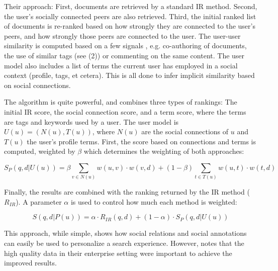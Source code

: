 Their approach: First, documents are retrieved by a standard IR method. Second, the user's socially connected peers
are also retrieved. Third, the initial ranked list of documents is re-ranked based on how strongly they are connected 
to the user's peers, and how strongly those peers are connected to the user. The user-user similarity is
computed based on a few signals \cite[p2]{Carmel2009}, e.g. co-authoring of documents, the use of similar tags
(see (2)) or commenting on the same content. 
The user model also includes a list of terms the current user has employed in a social context (profile, tags, et cetera).
This is all done to infer implicit similarity based on social connections.

The algorithm is quite powerful, and combines three types of rankings: 
The initial IR score, the social connection score, and a term score, where the terms are tags and keywords used by a user.
The user model is $U(u) = (N(u), T(u))$, 
where $N(u)$ are the social connections of $u$ and $T(u)$ the user's profile terms.
First, the score based on connections and terms is computed, weighted by $\beta$ which determines the weighting of both approaches:

\begin{equation*}
  S_P(q,d|U(u)) = \beta \sum_{v \in N(u)} w(u,v) \cdot w(v,d) + (1-\beta) \sum_{t \in T(u)} w(u,t) \cdot w(t,d)
\end{equation*}

Finally, the results are combined with the ranking returned by the IR method ($R_{IR}$). 
A parameter $\alpha$ is used to control how much each method is weighted:

\begin{equation*}
  S(q,d|P(u)) = \alpha \cdot R_{IR}(q,d) + (1-\alpha) \cdot S_P(q,d|U(u)) 
\end{equation*}

This approach, while simple, shows how social relations and social annotations can easily be used to personalize a search experience.
However, \citet[p10]{Carmel2009} notes that the high quality data in their enterprise setting were important
to achieve the improved results. 




